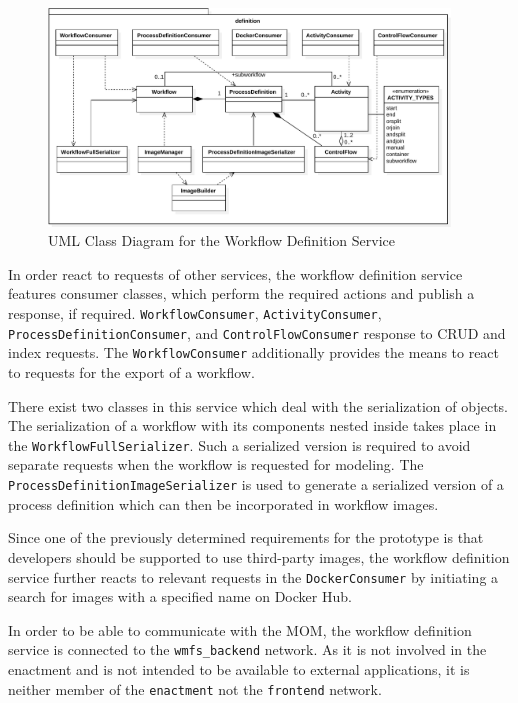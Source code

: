     \begin{figure}[tbp]
      \centering
      \includegraphics[width=0.95\textwidth]{content/images/class_diagram_definition-crop.pdf}
      \caption{UML Class Diagram for the Workflow Definition Service}
      \label{fig:uml_class_diagram_for_the_definition_service}
    \end{figure}

    In order react to requests of other services, the workflow definition service features consumer classes, which perform the required actions and publish a response, if required. \texttt{WorkflowConsumer}, \texttt{ActivityConsumer}, \texttt{ProcessDefinitionConsumer}, and \texttt{ControlFlowConsumer} response to \ac{CRUD} and index requests. The \texttt{WorkflowConsumer} additionally provides the means to react to requests for the export of a workflow.

    There exist two classes in this service which deal with the serialization of objects.
    The serialization of a workflow with its components nested inside takes place in the \texttt{WorkflowFullSerializer}. Such a serialized version is required to avoid separate requests when the workflow is requested for modeling. The \texttt{ProcessDefinitionImageSerializer} is used to generate a serialized version of a process definition which can then be incorporated in workflow images.

    Since one of the previously determined requirements for the prototype is that developers should be supported to use third-party images, the workflow definition service further reacts to relevant requests in the \texttt{DockerConsumer} by initiating a search for images with a specified name on Docker Hub.

    In order to be able to communicate with the \ac{MOM}, the workflow definition service is connected to the \texttt{wmfs\_backend} network. As it is not involved in the enactment and is not intended to be available to external applications, it is neither member of the \texttt{enactment} not the \texttt{frontend} network.

